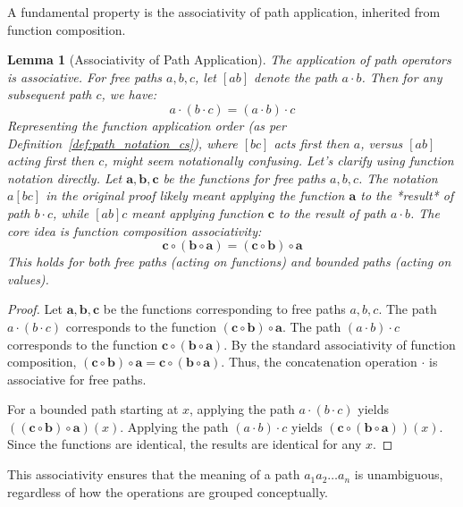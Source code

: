 \documentclass[12pt]{article}
\newtheorem{lemma}{Lemma}[section]
\begin{document}
A fundamental property is the associativity of path application, inherited from function composition.

\begin{lemma}[Associativity of Path Application]\label{lemma:associative_cs}
The application of path operators is associative. For free paths \( a, b, c \), let \( [a b] \) denote the path \( a \cdot b \). Then for any subsequent path \( c \), we have:
\[
a \cdot (b \cdot c) = (a \cdot b) \cdot c
\]
Representing the function application order (as per Definition~\ref{def:path_notation_cs}), where \( [b c] \) acts first then \( a \), versus \( [a b] \) acting first then \( c \), might seem notationally confusing. Let's clarify using function notation directly. Let \( \mathbf{a}, \mathbf{b}, \mathbf{c} \) be the functions for free paths \(a, b, c\). The notation \(a [b c]\) in the original proof likely meant applying the function \(\mathbf{a}\) to the *result* of path \(b \cdot c\), while \([a b] c\) meant applying function \(\mathbf{c}\) to the result of path \(a \cdot b\). The core idea is function composition associativity:
\[
\mathbf{c} \circ (\mathbf{b} \circ \mathbf{a}) = (\mathbf{c} \circ \mathbf{b}) \circ \mathbf{a}
\]
This holds for both free paths (acting on functions) and bounded paths (acting on values).
\end{lemma}

\begin{proof} %
Let \( \mathbf{a}, \mathbf{b}, \mathbf{c} \) be the functions corresponding to free paths \( a, b, c \).
The path \( a \cdot (b \cdot c) \) corresponds to the function \( (\mathbf{c} \circ \mathbf{b}) \circ \mathbf{a} \).
The path \( (a \cdot b) \cdot c \) corresponds to the function \( \mathbf{c} \circ (\mathbf{b} \circ \mathbf{a}) \).
By the standard associativity of function composition, \( (\mathbf{c} \circ \mathbf{b}) \circ \mathbf{a} = \mathbf{c} \circ (\mathbf{b} \circ \mathbf{a}) \). Thus, the concatenation operation \( \cdot \) is associative for free paths.

For a bounded path starting at \( x \), applying the path \( a \cdot (b \cdot c) \) yields \( ((\mathbf{c} \circ \mathbf{b}) \circ \mathbf{a})(x) \). Applying the path \( (a \cdot b) \cdot c \) yields \( (\mathbf{c} \circ (\mathbf{b} \circ \mathbf{a}))(x) \). Since the functions are identical, the results are identical for any \( x \).
\end{proof}

This associativity ensures that the meaning of a path \( a_1 a_2 \dots a_n \) is unambiguous, regardless of how the operations are grouped conceptually.
\end{document}
